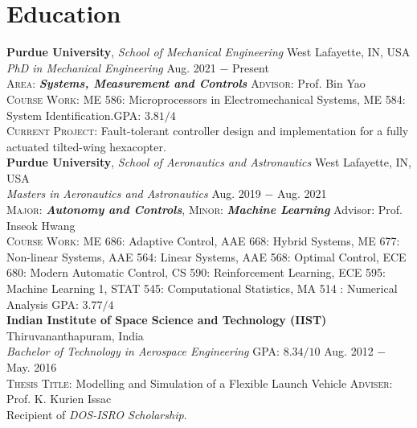 \documentclass[letterpaper,10pt]{article}
\begin{document}
\section{Education}
\noindent \textbf{Purdue University}, \textit{School of Mechanical Engineering} \hfill West Lafayette, IN, USA \\
\textit{PhD in Mechanical Engineering} \hfill Aug. 2021 $-$ Present\\
\textsc{Area}: \textit{\textbf{Systems, Measurement and Controls}}  \hfill \textsc{Advisor}: Prof. Bin Yao\\
\textsc{Course Work:} ME 586: Microprocessors in Electromechanical Systems, ME 584: System Identification.\hfill \textsc{GPA}: $3.81/4$\\
\textsc{Current Project}: Fault-tolerant controller design and implementation for a fully actuated tilted-wing hexacopter.\\

\vspace{5pt}
\noindent \textbf{Purdue University}, \textit{School of Aeronautics and Astronautics} \hfill West Lafayette, IN, USA \\
\textit{Masters in Aeronautics and Astronautics} \hfill Aug. 2019 $-$ Aug. 2021\\
\textsc{Major}: \textit{\textbf{Autonomy and Controls}}, \textsc{Minor}: \textit{\textbf{Machine Learning}}
\hfill Advisor: Prof. Inseok Hwang\\
\textsc{Course Work}: ME 686: Adaptive Control, AAE 668: Hybrid Systems, ME 677: Non-linear Systems, AAE 564: Linear Systems,  AAE 568: Optimal Control, ECE 680: Modern Automatic Control, CS 590: Reinforcement Learning, ECE 595: Machine Learning 1, STAT 545: Computational Statistics, MA 514 : Numerical Analysis
\hfill \textsc{GPA}: $3.77/4$\\


\vspace{5pt}
\noindent \textbf{Indian Institute of Space Science and Technology (IIST)} \hfill Thiruvananthapuram, India\\
\textit{Bachelor of Technology in Aerospace Engineering} \hfill \textsc{GPA}: $8.34/10$ \hfill Aug. 2012 $-$ May. 2016 \\
\textsc{Thesis Title}: Modelling and Simulation of a Flexible Launch Vehicle
\hfill \textsc{Adviser}: Prof. K. Kurien Issac \\
Recipient of \textit{DOS-ISRO Scholarship}.
\end{document}
